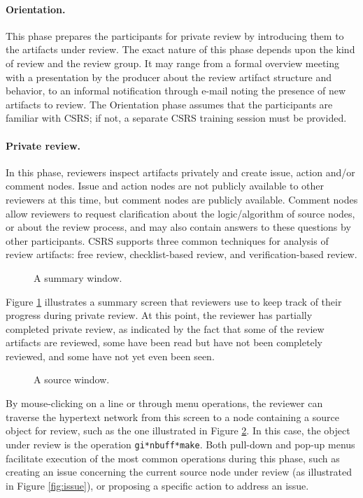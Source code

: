 \paragraph{Orientation.} This phase prepares the participants for private
review by introducing them to the artifacts under review.  The exact nature
of this phase depends upon the kind of review and the review group.  It may
range from a formal overview meeting with a presentation by the producer
about the review artifact structure and behavior, to an informal
notification through e-mail noting the presence of new artifacts to review.
The Orientation phase assumes that the participants are familiar with CSRS;
if not, a separate CSRS training session must be provided.

\paragraph {Private review.} In this phase, reviewers inspect 
artifacts privately and create issue, action and/or comment nodes.  Issue
and action nodes are not publicly available to other reviewers at this
time, but comment nodes are publicly available.  Comment nodes allow
reviewers to request clarification about the logic/algorithm of source
nodes, or about the review process, and may also contain answers to these
questions by other participants.  CSRS supports three common techniques for
analysis of review artifacts: free review, checklist-based review, and
verification-based review.

\begin{figure}                                        
 {\centerline{}}
\caption{A summary window.}
\label{fig:summary}
\end{figure}

Figure \ref{fig:summary} illustrates a summary
screen that reviewers use to keep track of their progress during private
review.  At this point, the reviewer has partially completed private
review, as indicated by the fact that some of the review artifacts are
reviewed, some have been read but have not been completely reviewed, and
some have not yet even been seen.


\begin{figure}                                        
 {\centerline{}}
\caption{A source window.}
\label{fig:source}
\end{figure}

By mouse-clicking on a line or through menu operations, the reviewer can
traverse the hypertext network from this screen to a node containing a
source object for review, such as the one illustrated in Figure
\ref{fig:source}.  In this case, the object
under review is the operation {\tt gi*nbuff*make}.  Both pull-down and
pop-up menus facilitate execution of the most common operations during this
phase, such as creating an issue concerning the current source node under
review (as illustrated in Figure \ref{fig:issue}), or proposing a specific action to address an issue.

